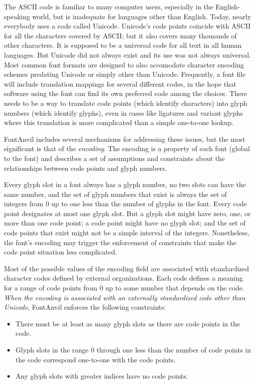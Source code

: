 The ASCII code is familiar to many computer users, especially in the
English-speaking world, but is inadequate for languages other than English. 
Today, nearly everybody uses a code called Unicode.  Unicode's code points
coincide with ASCII for all the characters covered by ASCII; but it also
covers many thousands of other characters.  It is supposed to be a universal
code for all text in all human languages.  But Unicode did not always exist and its use was not always
universal.  Most common font formats are designed to also accomodate
character encoding schemes predating Unicode or simply other than Unicode. 
Frequently, a font file will include translation mappings for several
different codes, in the hope that software using the font can find its own
preferred code among the choices.  There needs to be a way to translate code
points (which identify characters) into glyph numbers (which identify
glyphs), even in cases like ligatures and variant glyphs where this
translation is more complicated than a simple one-to-one lookup.

FontAnvil includes several mechanisms for addressing these issues, but the
most significant is that of the \emph{encoding}.  The encoding is a
property of each font (global to the font) and describes a set of
assumptions and constraints about the relationships between code points and
glyph numbers.

\begin{framed}
Every glyph slot in a font always has a glyph number, no two slots can have
the same number, and the set of glyph numbers that exist is always the set
of integers from 0 up to one less than the number of glyphs in the font. 
Every code point designates at most one glyph slot.  But a glyph slot might
have zero, one, or more than one code point; a code point might have no
glyph slot; and the set of code points that exist might not be a simple
interval of the integers.  Nonetheless, the font's encoding may trigger the
enforcement of constraints that make the code point situation less
complicated.
\end{framed}

Most of the possible values of the encoding field are associated with
standardized character codes defined by external organizations.  Each code
defines a meaning for a range of code points from 0 up to some number that
depends on the code.  \emph{When the encoding is associated with an
externally standardized code other than Unicode}, FontAnvil enforces the
following constraints:
\begin{itemize}
\item There must be at least as many glyph slots as there are code points in
the code.
\item Glyph slots in the range 0 through one less than the number of code
points in the code correspond one-to-one with the code points.
\item Any glyph slots with greater indices have no code points.
\end{itemize}

